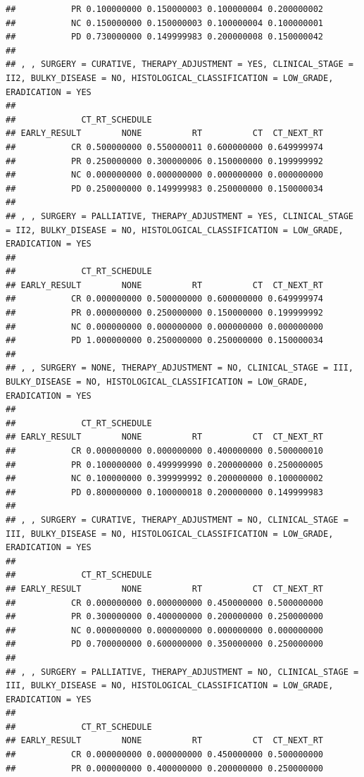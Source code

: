 \documentclass[]{article}
\begin{document}
\begin{verbatim}
##           PR 0.100000000 0.150000003 0.100000004 0.200000002
##           NC 0.150000000 0.150000003 0.100000004 0.100000001
##           PD 0.730000000 0.149999983 0.200000008 0.150000042
## 
## , , SURGERY = CURATIVE, THERAPY_ADJUSTMENT = YES, CLINICAL_STAGE = II2, BULKY_DISEASE = NO, HISTOLOGICAL_CLASSIFICATION = LOW_GRADE, ERADICATION = YES
## 
##             CT_RT_SCHEDULE
## EARLY_RESULT        NONE          RT          CT  CT_NEXT_RT
##           CR 0.500000000 0.550000011 0.600000000 0.649999974
##           PR 0.250000000 0.300000006 0.150000000 0.199999992
##           NC 0.000000000 0.000000000 0.000000000 0.000000000
##           PD 0.250000000 0.149999983 0.250000000 0.150000034
## 
## , , SURGERY = PALLIATIVE, THERAPY_ADJUSTMENT = YES, CLINICAL_STAGE = II2, BULKY_DISEASE = NO, HISTOLOGICAL_CLASSIFICATION = LOW_GRADE, ERADICATION = YES
## 
##             CT_RT_SCHEDULE
## EARLY_RESULT        NONE          RT          CT  CT_NEXT_RT
##           CR 0.000000000 0.500000000 0.600000000 0.649999974
##           PR 0.000000000 0.250000000 0.150000000 0.199999992
##           NC 0.000000000 0.000000000 0.000000000 0.000000000
##           PD 1.000000000 0.250000000 0.250000000 0.150000034
## 
## , , SURGERY = NONE, THERAPY_ADJUSTMENT = NO, CLINICAL_STAGE = III, BULKY_DISEASE = NO, HISTOLOGICAL_CLASSIFICATION = LOW_GRADE, ERADICATION = YES
## 
##             CT_RT_SCHEDULE
## EARLY_RESULT        NONE          RT          CT  CT_NEXT_RT
##           CR 0.000000000 0.000000000 0.400000000 0.500000010
##           PR 0.100000000 0.499999990 0.200000000 0.250000005
##           NC 0.100000000 0.399999992 0.200000000 0.100000002
##           PD 0.800000000 0.100000018 0.200000000 0.149999983
## 
## , , SURGERY = CURATIVE, THERAPY_ADJUSTMENT = NO, CLINICAL_STAGE = III, BULKY_DISEASE = NO, HISTOLOGICAL_CLASSIFICATION = LOW_GRADE, ERADICATION = YES
## 
##             CT_RT_SCHEDULE
## EARLY_RESULT        NONE          RT          CT  CT_NEXT_RT
##           CR 0.000000000 0.000000000 0.450000000 0.500000000
##           PR 0.300000000 0.400000000 0.200000000 0.250000000
##           NC 0.000000000 0.000000000 0.000000000 0.000000000
##           PD 0.700000000 0.600000000 0.350000000 0.250000000
## 
## , , SURGERY = PALLIATIVE, THERAPY_ADJUSTMENT = NO, CLINICAL_STAGE = III, BULKY_DISEASE = NO, HISTOLOGICAL_CLASSIFICATION = LOW_GRADE, ERADICATION = YES
## 
##             CT_RT_SCHEDULE
## EARLY_RESULT        NONE          RT          CT  CT_NEXT_RT
##           CR 0.000000000 0.000000000 0.450000000 0.500000000
##           PR 0.000000000 0.400000000 0.200000000 0.250000000

\end{verbatim}
\end{document}
